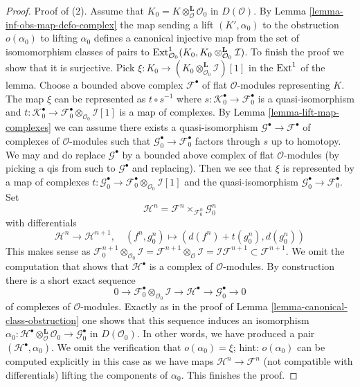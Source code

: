 \begin{proof}
\medskip\noindent
Proof of (2).
Assume that $K_0 = K \otimes_\mathcal{O}^\mathbf{L} \mathcal{O}_0$
in $D(\mathcal{O})$. By Lemma \ref{lemma-inf-obs-map-defo-complex}
the map sending a lift $(K', \alpha_0)$ to the obstruction $o(\alpha_0)$
to lifting $\alpha_0$ defines a canonical injective map
from the set of isomomorphism classes of pairs
to $\mathop{\mathrm{Ext}}\nolimits^1_{\mathcal{O}_0}(K_0,
K_0 \otimes_{\mathcal{O}_0}^\mathbf{L} \mathcal{I})$.
To finish the proof we show that it is surjective.
Pick $\xi : K_0 \to (K_0 \otimes_{\mathcal{O}_0}^\mathbf{L} \mathcal{I})[1]$
in the $\mathop{\mathrm{Ext}}\nolimits^1$ of the lemma.
Choose a bounded above complex $\mathcal{F}^\bullet$
of flat $\mathcal{O}$-modules representing $K$.
The map $\xi$ can be represented as $t \circ s^{-1}$
where $s : \mathcal{K}_0^\bullet \to \mathcal{F}_0^\bullet$
is a quasi-isomorphism and
$t : \mathcal{K}_0^\bullet \to
\mathcal{F}_0^\bullet \otimes_{\mathcal{O}_0} \mathcal{I}[1]$
is a map of complexes.
By Lemma \ref{lemma-lift-map-complexes}
we can assume there exists a quasi-isomorphism
$\mathcal{G}^\bullet \to \mathcal{F}^\bullet$
of complexes of $\mathcal{O}$-modules
such that $\mathcal{G}_0^\bullet \to \mathcal{F}_0^\bullet$
factors through $s$ up to homotopy.
We may and do replace $\mathcal{G}^\bullet$ by a bounded
above complex of flat $\mathcal{O}$-modules (by picking a qis
from such to $\mathcal{G}^\bullet$ and replacing).
Then we see that $\xi$ is represented by
a map of complexes
$t : \mathcal{G}_0^\bullet \to
\mathcal{F}_0^\bullet \otimes_{\mathcal{O}_0} \mathcal{I}[1]$
and the quasi-isomorphism $\mathcal{G}_0^\bullet \to \mathcal{F}_0^\bullet$.
Set
$$
\mathcal{H}^n = \mathcal{F}^n \times_{\mathcal{F}_0^n} \mathcal{G}_0^n
$$
with differentials
$$
\mathcal{H}^n \to \mathcal{H}^{n + 1},\quad
(f^n, g_0^n) \mapsto (d(f^n) + t(g_0^n), d(g_0^n))
$$
This makes sense as
$\mathcal{F}_0^{n + 1} \otimes_{\mathcal{O}_0} \mathcal{I} =
\mathcal{F}^{n + 1} \otimes_\mathcal{O} \mathcal{I} =
\mathcal{I}\mathcal{F}^{n + 1} \subset \mathcal{F}^{n + 1}$.
We omit the computation that shows that $\mathcal{H}^\bullet$
is a complex of $\mathcal{O}$-modules. By construction there is
a short exact sequence
$$
0 \to \mathcal{F}_0^\bullet \otimes_{\mathcal{O}_0} \mathcal{I} \to
\mathcal{H}^\bullet \to \mathcal{G}_0^\bullet \to 0
$$
of complexes of $\mathcal{O}$-modules.
Exactly as in the proof of Lemma \ref{lemma-canonical-class-obstruction}
one shows that this sequence induces an isomorphism
$\alpha_0 :
\mathcal{H}^\bullet \otimes_\mathcal{O}^\mathbf{L} \mathcal{O}_0 \to
\mathcal{G}_0^\bullet$ in $D(\mathcal{O}_0)$.
In other words, we have produced a pair $(\mathcal{H}^\bullet, \alpha_0)$.
We omit the verification that $o(\alpha_0) = \xi$; hint: $o(\alpha_0)$
can be computed explicitly in this case as we have maps
$\mathcal{H}^n \to \mathcal{F}^n$ (not compatible with differentials)
lifting the components of $\alpha_0$. This finishes the proof.
\end{proof}


















